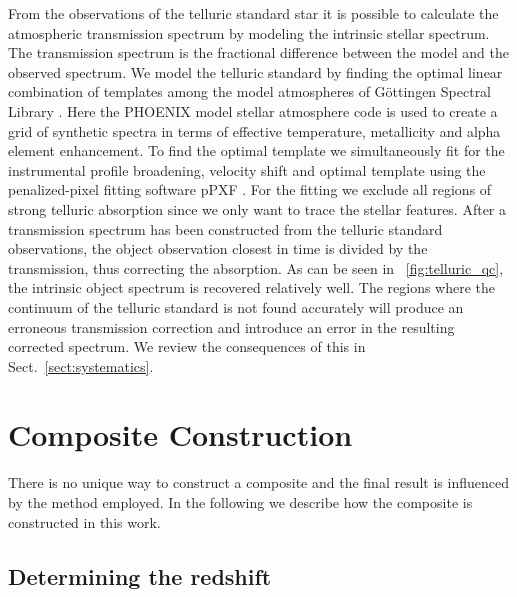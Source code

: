 \documentclass{aa}    %
\newcommand{\figref}[1]{\ref{fig:#1}}
\newcommand{\Fig}[1]{\figurename~\figref{#1}}
\newcommand{\fig}[1]{\Fig{#1}}
\newcommand{\sectionname}{Sect.}
\newcommand{\Sect}[1]{\sectionname~\ref{sect:#1}}
\newcommand{\sect}[1]{\Sect{#1}}
\newcommand{\sectlabel}[1]{\label{sect:#1}}
\begin{document}
From the observations of the telluric standard star it is possible to calculate
the atmospheric transmission spectrum by modeling the intrinsic stellar
spectrum. The transmission spectrum is the fractional difference between the
model and the observed spectrum. We model the telluric standard by finding the
optimal linear combination of templates among the model atmospheres of
G\"ottingen Spectral Library \citep{Husser2013}. Here the PHOENIX model stellar
atmosphere code is used to create a grid of synthetic spectra in terms of
effective temperature, metallicity and alpha element enhancement. To find the
optimal template we simultaneously fit for the instrumental profile broadening,
velocity shift and optimal template using the penalized-pixel fitting software
pPXF \citep{Cappellari2004}. For the fitting we exclude all regions of strong
telluric absorption since we only want to trace the stellar features. After a
transmission spectrum has been constructed from the telluric standard
observations, the object observation closest in time is divided by the
transmission, thus correcting the absorption. As can be seen in
\fig{telluric_qc}, the intrinsic object spectrum is recovered relatively well.
The regions where the continuum of the telluric standard is not found accurately
will produce an erroneous transmission correction and introduce an error in the
resulting corrected spectrum. We review the consequences of this in
\sect{systematics}. 



\section{Composite Construction}   \sectlabel{construct}

There is no unique way to construct a composite and the final result is
influenced by the method employed. In the following we describe how the
composite is constructed in this work.

\subsection{Determining the redshift}  \sectlabel{redshifts}
\end{document}
